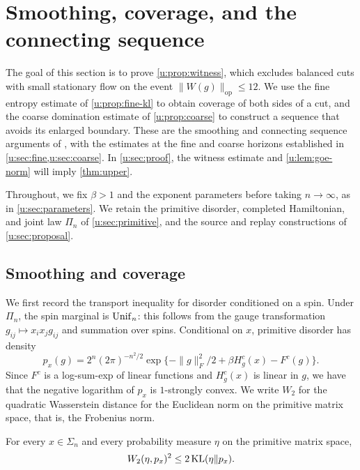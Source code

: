 \chapter{Smoothing, coverage, and the connecting sequence}\label{u:sec:connections}

The goal of this section is to prove \cref{u:prop:witness}, which excludes
balanced cuts with small stationary flow on the event
$\|W(g)\|_{\mathrm{op}}\le12$. We use the fine entropy estimate of
\cref{u:prop:fine-kl} to obtain coverage of both sides of a cut, and the
coarse domination estimate of \cref{u:prop:coarse} to construct a sequence
that avoids its enlarged boundary. These are the smoothing and connecting
sequence arguments of \cite[Sections~5--6, Propositions~6--7]{oai-typical-upper},
with the estimates at the fine and coarse horizons established in
\cref{u:sec:fine,u:sec:coarse}. In \cref{u:sec:proof}, the witness estimate
and \cref{u:lem:goe-norm} will imply \cref{thm:upper}.

Throughout, we fix $\beta>1$ and the exponent parameters before taking
$n\to\infty$, as in \cref{u:sec:parameters}. We retain the primitive disorder,
completed Hamiltonian, and joint law $\Pi_n$ of \cref{u:sec:primitive},
and the source and replay constructions of \cref{u:sec:proposal}.

\section{Smoothing and coverage}\label{u:sec:smoothing}

We first record the transport inequality for disorder conditioned on a
spin. Under $\Pi_n$, the spin marginal is $\operatorname{Unif}_n$: this follows from the
gauge transformation $g_{ij}\mapsto x_ix_jg_{ij}$ and summation over spins.
Conditional on $x$, primitive disorder has density
\begin{equation}\label{u:eq:conditional-density}
 p_x(g)=2^n(2\pi)^{-n^2/2}
       \exp\{-\|g\|_F^2/2+\beta H^c_g(x)-F^c(g)\}.
\end{equation}
Since $F^c$ is a log-sum-exp of linear functions and $H^c_g(x)$ is
linear in $g$, we have that the negative logarithm of $p_x$ is
$1$-strongly convex.
We write $W_2$ for the quadratic Wasserstein distance for the Euclidean
norm on the primitive matrix space, that is, the Frobenius norm.

\begin{lemma}\label{u:lem:transport}
For every $x\in\Sigma_n$ and every probability measure $\eta$ on the
primitive matrix space,
\begin{equation}\label{u:eq:conditional-transport}
 W_2(\eta,p_x)^2\le2\operatorname{KL}(\eta\Vert p_x).
\end{equation}
\end{lemma}

